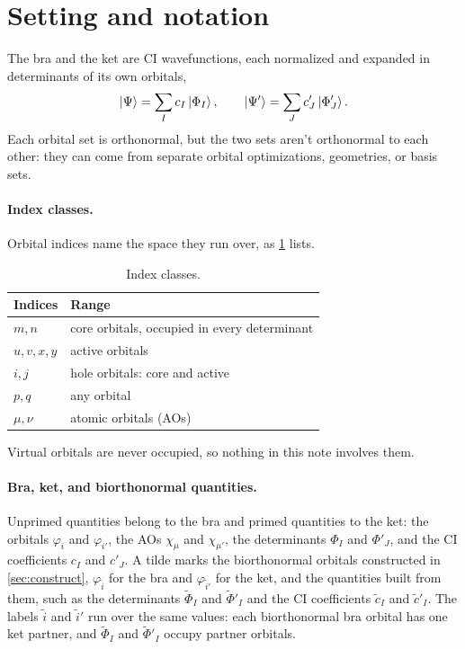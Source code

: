 \documentclass[aip,jcp,preprint]{revtex4-1}
\begin{document}
\section{Setting and notation}
\label{sec:notation}

The bra and the ket are CI wavefunctions, each normalized and expanded in determinants of its own orbitals,
\begin{equation}
 \ket{\Psi} = \sum_I c_I \ket{\Phi_I},
 \qquad
 \ket{\Psi'} = \sum_J c'_J \ket{\Phi'_J}.
\end{equation}
Each orbital set is orthonormal, but the two sets aren't orthonormal to each other: they can come from separate orbital optimizations, geometries, or basis sets.

\paragraph{Index classes.}
Orbital indices name the space they run over, as \cref{tab:indices} lists.

\begin{table}[h]
\caption{Index classes.}
\label{tab:indices}
\begin{tabular}{@{}ll@{}}
\hline
Indices & Range \\
\hline
$m, n$ & core orbitals, occupied in every determinant \\
$u, v, x, y$ & active orbitals \\
$i, j$ & hole orbitals: core and active \\
$p, q$ & any orbital \\
$\mu, \nu$ & atomic orbitals (AOs) \\
\hline
\end{tabular}
\end{table}
Virtual orbitals are never occupied, so nothing in this note involves them.

\paragraph{Bra, ket, and biorthonormal quantities.}
Unprimed quantities belong to the bra and primed quantities to the ket: the orbitals $\varphi_i$ and $\varphi_{i'}$, the AOs $\chi_\mu$ and $\chi_{\mu'}$, the determinants $\Phi_I$ and $\Phi'_J$, and the CI coefficients $c_I$ and $c'_J$.
A tilde marks the biorthonormal orbitals constructed in \cref{sec:construct}, $\varphi_{\tilde{i}}$ for the bra and $\varphi_{\tilde{i}'}$ for the ket, and the quantities built from them, such as the determinants $\tilde{\Phi}_I$ and $\tilde{\Phi}'_I$ and the CI coefficients $\tilde{c}_I$ and $\tilde{c}'_I$.
The labels $\tilde{i}$ and $\tilde{i}'$ run over the same values: each biorthonormal bra orbital has one ket partner, and $\tilde{\Phi}_I$ and $\tilde{\Phi}'_I$ occupy partner orbitals.
\end{document}

